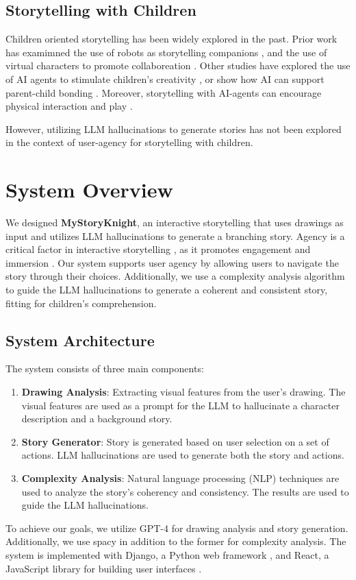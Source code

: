 \documentclass[submit,techrep,english]{ipsj}
\begin{document}
\subsection{Storytelling with Children}
Children oriented storytelling has been widely explored in the past. Prior work has examimned the use of robots as storytelling companions \cite{7:SunLLL17}, and the use of virtual characters to promote collaboreation \cite{2:LiuLWCS12}. Other studies have explored the use of AI agents to stimulate children's creativity \cite{1:ElgarfP22}, or show how AI can support parent-child bonding \cite{12:ZhangXWYRWYWL22}. Moreover, storytelling with AI-agents can encourage physical interaction and play \cite{3:ZhaoB23}.

However, utilizing LLM hallucinations to generate stories has not been explored in the context of user-agency for storytelling with children.

\section{System Overview}
\label{sec:system-overview}
We designed \textbf{MyStoryKnight}, an interactive storytelling that uses drawings as input and utilizes LLM hallucinations to generate a branching story. Agency is a critical factor in interactive storytelling \cite{11:LimaGV20}, as it promotes engagement and immersion \cite{12:ZhangXWYRWYWL22}. Our system supports user agency by allowing users to navigate the story through their choices. Additionally, we use a complexity analysis algorithm to guide the LLM hallucinations to generate a coherent and consistent story, fitting for children's comprehension.

\subsection{System Architecture}
\label{subsec:system-architecture}
The system consists of three main components:
\begin{enumerate}
    \item \textbf{Drawing Analysis}: Extracting visual features from the user's drawing. The visual features are used as a prompt for the LLM to hallucinate a character description and a background story.
    \item \textbf{Story Generator}: Story is generated based on user selection on a set of actions. LLM hallucinations are used to generate both the story and actions.
    \item \textbf{Complexity Analysis}: Natural language processing (NLP) techniques are used to analyze the story's coherency and consistency. The results are used to guide the LLM hallucinations.
\end{enumerate}
To achieve our goals, we utilize GPT-4 \cite{16:abs-2303-08774} for drawing analysis and story generation. Additionally, we use spacy \cite{17:spacy} in addition to the former for complexity analysis. The system is implemented with Django, a Python web framework \cite{18:django}, and React, a JavaScript library for building user interfaces \cite{19:react}.
\end{document}
